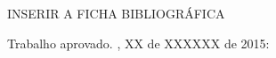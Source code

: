 \documentclass[
	12pt,				%
	openright,			%
	oneside,
	a4paper,			%
	english,			%
	francais,				%
	spanish,			%
	brazil				%
	]{abntex2}
\begin{document}

\frenchspacing 


\imprimircapa

\imprimirfolhaderosto*

INSERIR A FICHA BIBLIOGRÁFICA


%
% 
%
\begin{folhadeaprovacao}

  \begin{center}
    {\ABNTEXchapterfont\large\imprimirautor}

    \vspace*{\fill}\vspace*{\fill}
    \begin{center}
      \ABNTEXchapterfont\bfseries\Large\imprimirtitulo
    \end{center}
    \vspace*{\fill}
    
    \hspace{.45\textwidth}
    \begin{minipage}{.5\textwidth}
        \imprimirpreambulo
    \end{minipage}%
    \vspace*{\fill}
   \end{center}
        
   Trabalho aprovado. \imprimirlocal, XX de XXXXXX de 2015:

      
   \begin{center}
    \vspace*{0.5cm}
    {\large\imprimirlocal}
    \par
    {\large\imprimirdata}
    \vspace*{1cm}
  \end{center}
  
\end{folhadeaprovacao}
\end{document}
